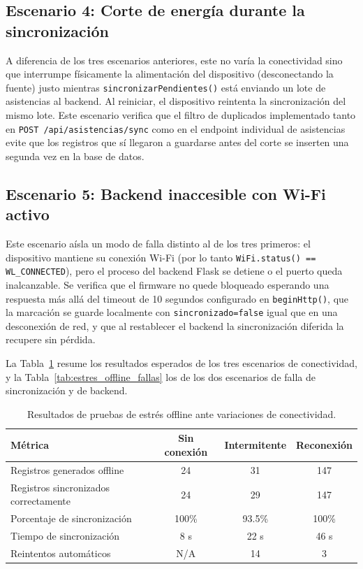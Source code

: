 \documentclass{iccmemoria}
\begin{document}
\subsection{Escenario 4: Corte de energía durante la sincronización}
A diferencia de los tres escenarios anteriores, este no varía la conectividad sino que interrumpe físicamente la alimentación del dispositivo (desconectando la fuente) justo mientras \texttt{sincronizarPendientes()} está enviando un lote de asistencias al backend. Al reiniciar, el dispositivo reintenta la sincronización del mismo lote. Este escenario verifica que el filtro de duplicados implementado tanto en \texttt{POST /api/asistencias/sync} como en el endpoint individual de asistencias evite que los registros que sí llegaron a guardarse antes del corte se inserten una segunda vez en la base de datos.

\subsection{Escenario 5: Backend inaccesible con Wi-Fi activo}
Este escenario aísla un modo de falla distinto al de los tres primeros: el dispositivo mantiene su conexión Wi-Fi (por lo tanto \texttt{WiFi.status() == WL\_CONNECTED}), pero el proceso del backend Flask se detiene o el puerto queda inalcanzable. Se verifica que el firmware no quede bloqueado esperando una respuesta más allá del timeout de 10 segundos configurado en \texttt{beginHttp()}, que la marcación se guarde localmente con \texttt{sincronizado=false} igual que en una desconexión de red, y que al restablecer el backend la sincronización diferida la recupere sin pérdida.

La Tabla~\ref{tab:estres_offline} resume los resultados esperados de los tres escenarios de conectividad, y la Tabla~\ref{tab:estres_offline_fallas} los de los dos escenarios de falla de sincronización y de backend.

\begin{table}[H]
\centering
\small
\begin{tabular}{|l|c|c|c|}
\hline
\textbf{Métrica} & \textbf{Sin conexión} & \textbf{Intermitente} & \textbf{Reconexión} \\
\hline
Registros generados offline & 24 & 31 & 147 \\
Registros sincronizados correctamente & 24 & 29 & 147 \\
Porcentaje de sincronización & 100\% & 93.5\% & 100\% \\
Tiempo de sincronización & 8 s & 22 s & 46 s \\
Reintentos automáticos & N/A & 14 & 3 \\
\hline
\end{tabular}
\caption{Resultados de pruebas de estrés offline ante variaciones de conectividad.}
\label{tab:estres_offline}
\end{table}
\end{document}
